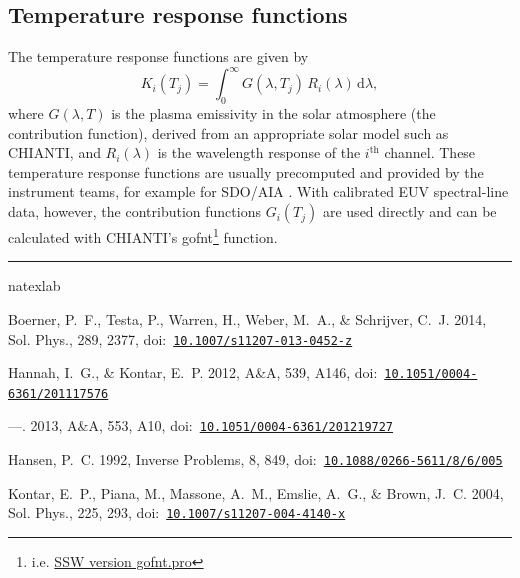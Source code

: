 \documentclass[12pt,a4paper]{article}
\newcommand{\aap}{A\&A}
\newcommand{\solphys}{Sol. Phys.}
\begin{document}
\subsection*{Temperature response functions}

The temperature response functions are given by
\begin{equation}
  K_i(T_j)=\int_0^\infty G(\lambda,T_j)\,R_i(\lambda)\,\mathrm{d}\lambda,
\end{equation}
where $G(\lambda,T)$ is the plasma emissivity in the solar atmosphere (the contribution function), derived from an appropriate solar model such as CHIANTI, and $R_i(\lambda)$ is the wavelength response of the $i^{\mathrm{th}}$ channel. These temperature response functions are usually precomputed and provided by the instrument teams, for example for SDO/AIA \citep{2014SoPh..289.2377B}. With calibrated EUV spectral-line data, however, the contribution functions $G_i(T_j)$ are used directly and can be calculated with CHIANTI's gofnt\footnote{i.e. \href{https://hesperia.gsfc.nasa.gov/ssw/packages/chianti/idl/emiss/gofnt.pro}{SSW version gofnt.pro}} function.

\newpage
\par\noindent\rule{0.5\textwidth}{0.4pt}

%
%	
\begin{thebibliography}{}
\expandafter\ifx\csname natexlab\endcsname\relax\def\natexlab#1{#1}\fi
\providecommand{\url}[1]{\href{#1}{#1}}
\providecommand{\dodoi}[1]{doi:~\href{http://doi.org/#1}{\nolinkurl{#1}}}
\providecommand{\doeprint}[1]{\href{http://ascl.net/#1}{\nolinkurl{http://ascl.net/#1}}}
\providecommand{\doarXiv}[1]{\href{https://arxiv.org/abs/#1}{\nolinkurl{https://arxiv.org/abs/#1}}}

{Boerner}, P.~F., {Testa}, P., {Warren}, H., {Weber}, M.~A., \& {Schrijver},
  C.~J. 2014, \solphys, 289, 2377, \dodoi{10.1007/s11207-013-0452-z}

{Hannah}, I.~G., \& {Kontar}, E.~P. 2012, \aap, 539, A146,
  \dodoi{10.1051/0004-6361/201117576}

---. 2013, \aap, 553, A10, \dodoi{10.1051/0004-6361/201219727}

{Hansen}, P.~C. 1992, Inverse Problems, 8, 849,
  \dodoi{10.1088/0266-5611/8/6/005}

{Kontar}, E.~P., {Piana}, M., {Massone}, A.~M., {Emslie}, A.~G., \& {Brown},
  J.~C. 2004, \solphys, 225, 293, \dodoi{10.1007/s11207-004-4140-x}

\end{thebibliography}
\end{document}

